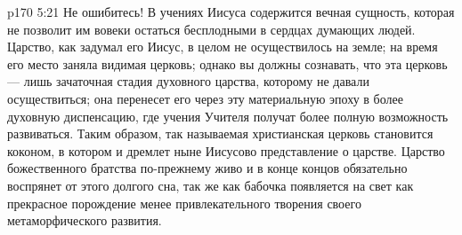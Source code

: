 \vs p170 5:21 Не ошибитесь! В учениях Иисуса содержится вечная сущность, которая не позволит им вовеки остаться бесплодными в сердцах думающих людей. Царство, как задумал его Иисус, в целом не осуществилось на земле; на время его место заняла видимая церковь; однако вы должны сознавать, что эта церковь --- лишь зачаточная стадия духовного царства, которому не давали осуществиться; она перенесет его через эту материальную эпоху в более духовную диспенсацию, где учения Учителя получат более полную возможность развиваться. Таким образом, так называемая христианская церковь становится коконом, в котором и дремлет ныне Иисусово представление о царстве. Царство божественного братства по\hyp{}прежнему живо и в конце концов обязательно воспрянет от этого долгого сна, так же как бабочка появляется на свет как прекрасное порождение менее привлекательного творения своего метаморфического развития.
